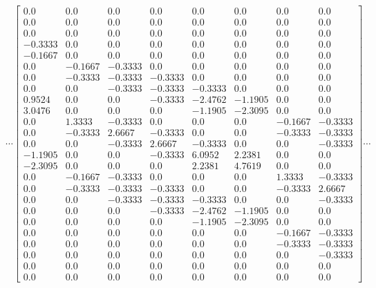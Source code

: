 \documentclass[12pt]{article}
\begin{document}
\[\cdots \left[\begin{matrix}0.0 & 0.0 & 0.0 & 0.0 & 0.0 & 0.0 & 0.0 & 0.0\\0.0 & 0.0 & 0.0 & 0.0 & 0.0 & 0.0 & 0.0 & 0.0\\0.0 & 0.0 & 0.0 & 0.0 & 0.0 & 0.0 & 0.0 & 0.0\\-0.3333 & 0.0 & 0.0 & 0.0 & 0.0 & 0.0 & 0.0 & 0.0\\-0.1667 & 0.0 & 0.0 & 0.0 & 0.0 & 0.0 & 0.0 & 0.0\\0.0 & -0.1667 & -0.3333 & 0.0 & 0.0 & 0.0 & 0.0 & 0.0\\0.0 & -0.3333 & -0.3333 & -0.3333 & 0.0 & 0.0 & 0.0 & 0.0\\0.0 & 0.0 & -0.3333 & -0.3333 & -0.3333 & 0.0 & 0.0 & 0.0\\0.9524 & 0.0 & 0.0 & -0.3333 & -2.4762 & -1.1905 & 0.0 & 0.0\\3.0476 & 0.0 & 0.0 & 0.0 & -1.1905 & -2.3095 & 0.0 & 0.0\\0.0 & 1.3333 & -0.3333 & 0.0 & 0.0 & 0.0 & -0.1667 & -0.3333\\0.0 & -0.3333 & 2.6667 & -0.3333 & 0.0 & 0.0 & -0.3333 & -0.3333\\0.0 & 0.0 & -0.3333 & 2.6667 & -0.3333 & 0.0 & 0.0 & -0.3333\\-1.1905 & 0.0 & 0.0 & -0.3333 & 6.0952 & 2.2381 & 0.0 & 0.0\\-2.3095 & 0.0 & 0.0 & 0.0 & 2.2381 & 4.7619 & 0.0 & 0.0\\0.0 & -0.1667 & -0.3333 & 0.0 & 0.0 & 0.0 & 1.3333 & -0.3333\\0.0 & -0.3333 & -0.3333 & -0.3333 & 0.0 & 0.0 & -0.3333 & 2.6667\\0.0 & 0.0 & -0.3333 & -0.3333 & -0.3333 & 0.0 & 0.0 & -0.3333\\0.0 & 0.0 & 0.0 & -0.3333 & -2.4762 & -1.1905 & 0.0 & 0.0\\0.0 & 0.0 & 0.0 & 0.0 & -1.1905 & -2.3095 & 0.0 & 0.0\\0.0 & 0.0 & 0.0 & 0.0 & 0.0 & 0.0 & -0.1667 & -0.3333\\0.0 & 0.0 & 0.0 & 0.0 & 0.0 & 0.0 & -0.3333 & -0.3333\\0.0 & 0.0 & 0.0 & 0.0 & 0.0 & 0.0 & 0.0 & -0.3333\\0.0 & 0.0 & 0.0 & 0.0 & 0.0 & 0.0 & 0.0 & 0.0\\0.0 & 0.0 & 0.0 & 0.0 & 0.0 & 0.0 & 0.0 & 0.0\end{matrix}\right]\cdots\]
\end{document}
